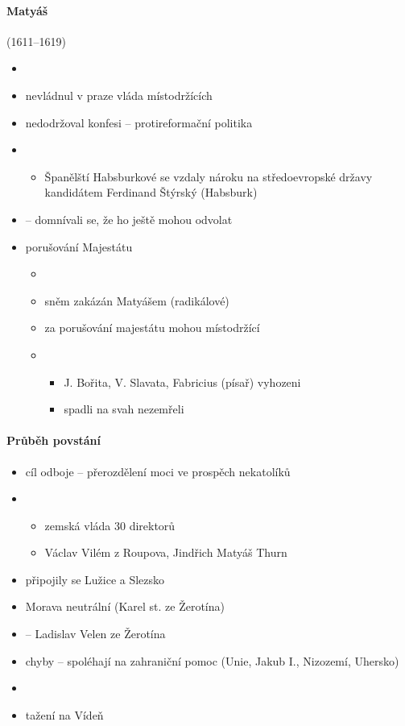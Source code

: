 \paragraph{Matyáš}(1611--1619)
\begin{itemize}
\item {}
\item nevládnul v praze \ra vláda místodržících
\item nedodržoval konfesi -- protireformační politika
\item {}
	\begin{itemize}
	\item Španělští Habsburkové se vzdaly nároku na středoevropské državy \ra kandidátem Ferdinand Štýrský (Habsburk)
	\end{itemize}
\item {} -- domnívali se, že ho ještě mohou odvolat
\item porušování Majestátu
	\begin{itemize}
	\item {}
	\item sněm zakázán Matyášem \ra {} (radikálové)
	\item[\ra] za porušování majestátu mohou místodržící
	\item {}
		\begin{itemize}
		\item J. Bořita, V. Slavata, Fabricius (písař) vyhozeni
		\item spadli na svah \ra nezemřeli
		\end{itemize}
	\end{itemize}
\end{itemize}

\paragraph{Průběh povstání}
\begin{itemize}
\item cíl odboje -- přerozdělení moci ve prospěch nekatolíků
\item {}
	\begin{itemize}
	\item zemská vláda 30 direktorů
	\item Václav Vilém z Roupova, Jindřich Matyáš Thurn
	\end{itemize}
\item připojily se Lužice a Slezsko
\item Morava neutrální (Karel st. ze Žerotína)
\item {} -- Ladislav Velen ze Žerotína
\item chyby -- spoléhají na zahraniční pomoc (Unie, Jakub I., Nizozemí, Uhersko)
\item {}
\item tažení na Vídeň
\end{itemize}

